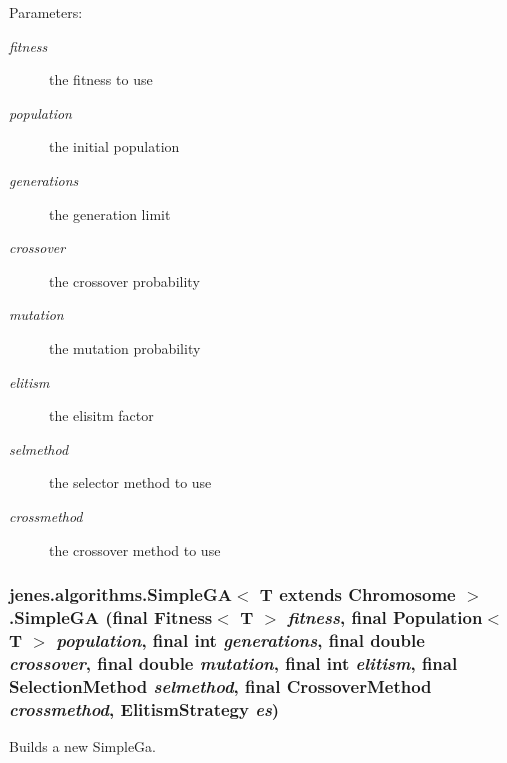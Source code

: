 \begin{Desc}
\item[Parameters:]
\begin{description}
\item[{\em fitness}]the fitness to use \item[{\em population}]the initial population \item[{\em generations}]the generation limit \item[{\em crossover}]the crossover probability \item[{\em mutation}]the mutation probability \item[{\em elitism}]the elisitm factor \item[{\em selmethod}]the selector method to use \item[{\em crossmethod}]the crossover method to use \end{description}
\end{Desc}
\hypertarget{classjenes_1_1algorithms_1_1_simple_g_a_3_01_t_01extends_01_chromosome_01_4_da2d647b3a202f4e6bb7d1b1c894791b}{
\subsubsection[SimpleGA]{\setlength{\rightskip}{0pt plus 5cm}jenes.algorithms.SimpleGA$<$ T extends Chromosome $>$.SimpleGA (final Fitness$<$ T $>$ {\em fitness}, \/  final Population$<$ T $>$ {\em population}, \/  final int {\em generations}, \/  final double {\em crossover}, \/  final double {\em mutation}, \/  final int {\em elitism}, \/  final {\bf SelectionMethod} {\em selmethod}, \/  final {\bf CrossoverMethod} {\em crossmethod}, \/  ElitismStrategy {\em es})}}
\label{classjenes_1_1algorithms_1_1_simple_g_a_3_01_t_01extends_01_chromosome_01_4_da2d647b3a202f4e6bb7d1b1c894791b}


Builds a new SimpleGa.

